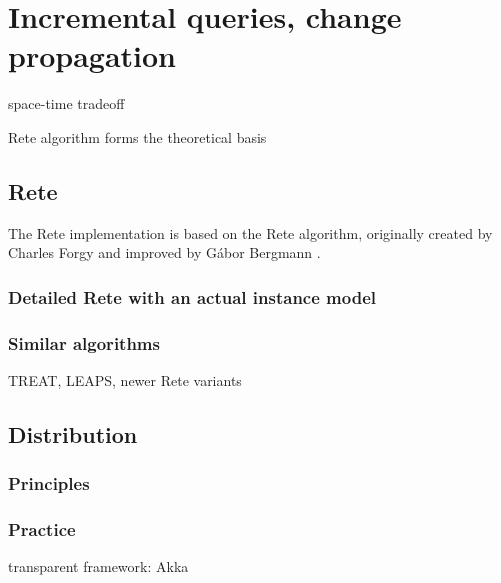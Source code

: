 \section{Incremental queries, change propagation}
\label{sec:incrementality}

space-time tradeoff

Rete algorithm forms the theoretical basis

\subsection{Rete}

The Rete implementation is based on the Rete algorithm, originally created by Charles Forgy \cite{Forgy} and improved by Gábor Bergmann \cite{BergmannRete}.


\subsubsection{Detailed Rete with an actual instance model}





\subsubsection{Similar algorithms}

TREAT, LEAPS, newer Rete variants


\subsection{Distribution}



\subsubsection{Principles}


\subsubsection{Practice}

transparent framework: Akka



